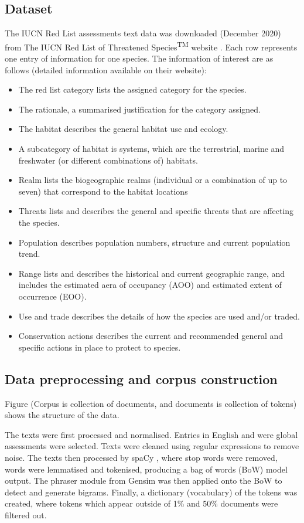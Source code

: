 \subsection{Dataset}

The IUCN Red List assessments text data was downloaded (December 2020) from The IUCN Red List of Threatened Species\textsuperscript{TM} website \parencite{iucn2021}. Each row represents one entry of information for one species. The information of interest are as follows (detailed information available on their website):
\begin{itemize}
    \item The red list category lists the assigned category for the species. 
    \item The rationale, a summarised justification for the category assigned. 
    \item The habitat describes the general habitat use and ecology. 
    \item A subcategory of habitat is systems, which are the terrestrial, marine and freshwater (or different combinations of) habitats.
    \item Realm lists the biogeographic realms (individual or a combination of up to seven) that correspond to the habitat locations
    \item Threats lists and describes the general and specific threats that are affecting the species. 
    \item Population describes population numbers, structure and current population trend. 
    \item Range lists and describes the historical and current geographic range, and includes the estimated aera of occupancy (AOO) and estimated extent of occurrence (EOO). 
    \item Use and trade describes the details of how the species are used and/or traded.
    \item Conservation actions describes the current and recommended general and specific actions in place to protect to species. 
\end{itemize}

\subsection{Data preprocessing and corpus construction}

Figure (Corpus is collection of documents, and documents is collection of tokens) shows the structure of the data. 

The texts were first processed and normalised. Entries in English and were global assessments were selected. Texts were cleaned using regular expressions to remove noise. The texts then processed by spaCy \parencite{spacy}, where stop words were removed, words were lemmatised and tokenised, producing a bag of words (BoW) model output. The phraser module from Gensim \parencite{rehurek_lrec} was then applied onto the BoW to detect and generate bigrams. Finally, a dictionary (vocabulary) of the tokens was created, where tokens which appear outside of 1\% and 50\% documents were filtered out. 

